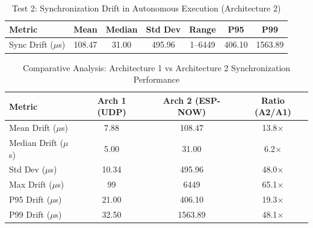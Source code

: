 
\begin{table}[htbp]
\centering
\caption{Test 2: Synchronization Drift in Autonomous Execution (Architecture 2)}
\begin{tabular}{|l|c|c|c|c|c|c|}
\hline
\textbf{Metric} & \textbf{Mean} & \textbf{Median} & \textbf{Std Dev} & \textbf{Range} & \textbf{P95} & \textbf{P99} \\ \hline
Sync Drift ($\mu$s) & 108.47 & 31.00 & 495.96 & 1--6449 & 406.10 & 1563.89 \\ \hline
\end{tabular}
\label{tab:test2_results}
\end{table}

\begin{table}[htbp]
\centering
\caption{Comparative Analysis: Architecture 1 vs Architecture 2 Synchronization Performance}
\begin{tabular}{|l|c|c|c|}
\hline
\textbf{Metric} & \textbf{Arch 1 (UDP)} & \textbf{Arch 2 (ESP-NOW)} & \textbf{Ratio (A2/A1)} \\ \hline
Mean Drift ($\mu$s) & 7.88 & 108.47 & 13.8$\times$ \\ \hline
Median Drift ($\mu$s) & 5.00 & 31.00 & 6.2$\times$ \\ \hline
Std Dev ($\mu$s) & 10.34 & 495.96 & 48.0$\times$ \\ \hline
Max Drift ($\mu$s) & 99 & 6449 & 65.1$\times$ \\ \hline
P95 Drift ($\mu$s) & 21.00 & 406.10 & 19.3$\times$ \\ \hline
P99 Drift ($\mu$s) & 32.50 & 1563.89 & 48.1$\times$ \\ \hline
\end{tabular}
\label{tab:comparative_analysis}
\end{table}

